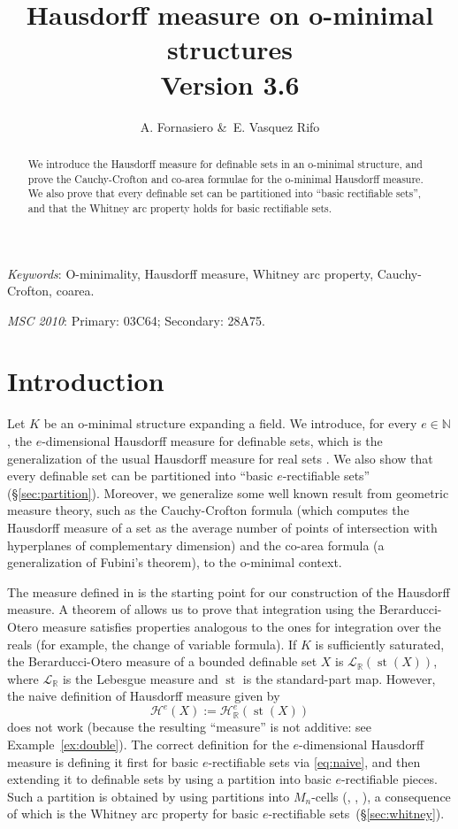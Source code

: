 \documentclass[a4paper, 12pt, final]{article}
\author{A. Fornasiero \&\ E. Vasquez Rifo}
\title{Hausdorff measure on o-minimal structures\\
\normalsize{Version {3.6}}}
\newtheorem{open problem}[lem]{Open problem}
\theoremstyle{remark}
\theoremstyle{definition}
\newtheorem{final remark}[lem]{Final remark}
\begin{document}
\maketitle

\begin{abstract}
We introduce the Hausdorff measure for definable sets in an o-minimal
structure, and prove the Cauchy-Crofton and co-area formulae for the
o-minimal Hausdorff measure.
We also prove that every definable set can be partitioned into ``basic
rectifiable sets'', and that  the Whitney arc property holds for basic rectifiable sets.
\end{abstract}

\textit{Keywords}:
O-minimality, Hausdorff measure, Whitney arc property, Cauchy-Crofton, coarea.

\textit{MSC 2010}:
Primary:  03C64;    	
Secondary: 28A75.    	

\section{Introduction}
Let ${K}$ be an o-minimal structure expanding a field.
We introduce, for every $e \in {\mathbb{N}}$, the 
$e$-dimensional Hausdorff measure for definable sets, which is the
generalization of the usual Hausdorff measure for real sets \cite{morgan}.
We also show that every definable set can be partitioned into ``basic
$e$-rectifiable sets'' (\S \ref{sec:partition}). 
Moreover, we generalize some well known result from geometric measure theory,
such as the Cauchy-Crofton formula (which computes the Hausdorff measure of a
set as the average number of points of intersection with hyperplanes
of complementary dimension) and the co-area formula (a generalization of
Fubini's theorem), to the o-minimal context.

The measure defined in \cite{bo} is the starting point for our construction
of the Hausdorff measure.  A theorem of \cite{bp} allows us to prove that
integration using the Berarducci-Otero measure
satisfies properties analogous to the ones for
integration over the reals (for example, the change of variable formula).  
If ${K}$ is sufficiently saturated, the Berarducci-Otero measure of a bounded
definable set $X$ is ${\mathcal L}_{\mathbb{R}}(\operatorname{st}(X))$, where ${\mathcal L}_{\mathbb{R}}$ is the Lebesgue
measure and $\operatorname{st}$ is the standard-part map.
However, the naive definition of Hausdorff measure given by
\begin{equation}
\label{eq:naive}
{\mathcal H}^e(X) := {\mathcal H}^e_{\mathbb{R}}(\operatorname{st}(X))
\end{equation}
does not work (because the resulting ``measure'' is not additive: see
Example~\ref{ex:double}). 
The correct definition for the $e$-dimensional Hausdorff measure  is 
defining it first for basic $e$-rectifiable sets via \eqref{eq:naive},
and then extending it to definable sets by using a partition into basic
$e$-rectifiable pieces. Such a partition is obtained by using partitions into
$M_n$-cells (\cite{kurdyka}, \cite{pawlucki}, \cite{evr}), a consequence of
which is the Whitney arc property for basic $e$-rectifiable sets~(\S\ref{sec:whitney}).
\end{document}
